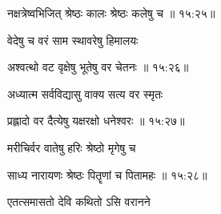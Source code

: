 
{\devanagarifont नक्षत्रेष्वभिजित् श्रेष्ठः कालः श्रेष्ठः कलेषु च  {॥ १५:२५॥} \veg\dontdisplaylinenum }%

{\devanagarifont वेदेषु च वरं साम स्थावरेषु हिमालयः \thinspace{\dandab} \dontdisplaylinenum }%
 

{\devanagarifont अश्वत्थो वट वृक्षेषु भूतेषु वर चेतनः {॥ १५:२६॥} \veg\dontdisplaylinenum }%

{\devanagarifont अध्यात्म सर्वविद्यासु वाक्य सत्य वर स्मृतः \thinspace{\dandab} \dontdisplaylinenum }%


{\devanagarifont प्रह्लादो वर दैत्येषु यक्षरक्षो धनेश्वरः {॥ १५:२७॥} \veg\dontdisplaylinenum }%

{\devanagarifont मरीचिर्वर वातेषु हरिः श्रेष्ठो मृगेषु च \thinspace{\dandab} \dontdisplaylinenum }%


{\devanagarifont साध्य नारायणः श्रेष्ठः पितॄणां च पितामहः {॥ १५:२८॥} \veg\dontdisplaylinenum }%
 
{\devanagarifont एतत्समासतो देवि कथितो ऽसि वरानने \thinspace{\dandab} \dontdisplaylinenum }%

